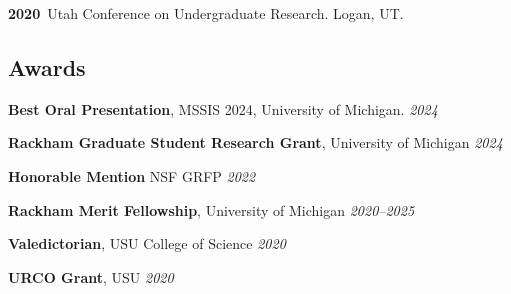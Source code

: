 \documentclass[11pt] {article}
\newenvironment {reflist}
                {
                 \begin{list}{}
                 {\setlength{\labelwidth}{0mm}
                  \setlength{\leftmargin}{8mm}
                  \setlength{\itemindent}{-3mm}
                  \setlength{\labelsep}{0mm}
                  \setlength{\parsep}{0.1 ex}
                  \setlength{\itemsep}{0.1cm}
      \setlength{\topsep}{0.15cm}}} %
   {\end{list}}
\begin{document}
\begin{reflist}
    \item \textbf{2020}\, Utah Conference on Undergraduate Research. Logan, UT.


\end{reflist}

\subsection*{Awards}

\noindent\hspace{5mm}\textbf{Best Oral Presentation}, MSSIS 2024, University of Michigan. \hfill {\textit{2024}}

\hspace{5mm}{\it Award amount: $\$200$}


\vspace{2mm}
\noindent\hspace{5mm}\textbf{Rackham Graduate Student Research Grant}, University of Michigan \hfill {\textit{2024}}

\hspace{5mm}{\it Award amount: $\$2500$}

\vspace{2mm}
\noindent\hspace{5mm}\textbf{Honorable Mention} NSF GRFP \hfill {\textit{2022}}

\vspace{2mm}
\noindent\hspace{5mm}\textbf{Rackham Merit Fellowship}, University of Michigan \hfill {\textit{2020--2025}}

\vspace{2mm}
\noindent\hspace{5mm}\textbf{Valedictorian}, USU College of Science \hfill {\textit{2020}}

\vspace{2mm}
\noindent\hspace{5mm}\textbf{URCO Grant}, USU \hfill  {\textit{2020}}
\end{document}
